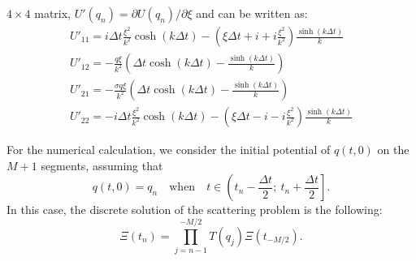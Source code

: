 $4 \times 4$ matrix, $U'(q_n) = \partial U(q_n) / \partial \xi$ and can be written as:
\begin{eqnarray}
    U'_{11} = i \Delta t \frac{\xi^2}{k^2} \cosh(k \Delta t) - \left( \xi \Delta t + i + i \frac{\xi^2}{k^2} \right) \frac{\sinh (k \Delta t)}{k} \nonumber \\
    U'_{12} = -\frac{q\xi}{k^2} \left( \Delta t \cosh(k\Delta t) - \frac{\sinh(k \Delta t)}{k}\right) \nonumber \\
    U'_{21} = -\frac{\sigma q \xi}{k^2} \left( \Delta t \cosh(k\Delta t) - \frac{\sinh(k \Delta t)}{k}\right) \nonumber \\ 
    U'_{22} = -i \Delta t \frac{\xi^2}{k^2} \cosh(k \Delta t) - \left( \xi \Delta t - i - i \frac{\xi^2}{k^2} \right) \frac{\sinh (k \Delta t)}{k}
\end{eqnarray}

For the numerical calculation, we consider the initial potential of $ q (t, 0) $ on the $ M + 1 $ segments, assuming that
\begin{equation}
    q(t, 0) = q_n  \quad \text{when} \quad t \in \left(t_n - \frac{\Delta t}{2}; \ t_n + \frac{\Delta t}{2} \right] {.}
\end{equation}
In this case, the discrete solution of the scattering problem is the following:
\begin{equation}
    \Xi(t_n) = \prod^{-M/2}_{j = n-1} T(q_j) \Xi(t_{-M/2}) {.}
\end{equation}

